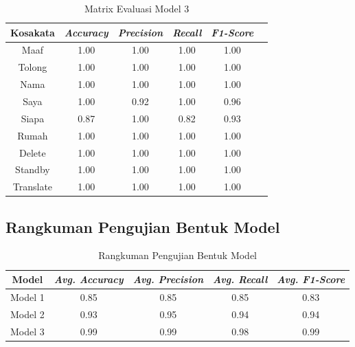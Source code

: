 \begin{longtable}{|c|c|c|c|c|c|}
  \caption{Matrix Evaluasi Model 3}
  \label{tb:model3stat}                                   \\
  \hline
  \rowcolor[HTML]{C0C0C0}
  \textbf{Kosakata} & \textbf{\emph{Accuracy}} & \textbf{\emph{Precision}} & \textbf{\emph{Recall}} & \textbf{\emph{F1-Score}} \\
  \hline
  Maaf              & 1.00                       & 1.00                        & 1.00                   & 1.00                \\
  Tolong            & 1.00                       & 1.00                        & 1.00                   & 1.00                \\
  Nama              & 1.00                       & 1.00                        & 1.00                   & 1.00                \\
  Saya              & 1.00                       & 0.92                        & 1.00                   & 0.96                \\
  Siapa             & 0.87                       & 1.00                        & 0.82                   & 0.93                \\
  Rumah             & 1.00                       & 1.00                        & 1.00                   & 1.00                \\
  Delete            & 1.00                       & 1.00                        & 1.00                   & 1.00                \\
  Standby           & 1.00                       & 1.00                        & 1.00                   & 1.00                \\
  Translate         & 1.00                       & 1.00                        & 1.00                   & 1.00                \\
  \hline
\end{longtable}

\subsection{Rangkuman Pengujian Bentuk Model}
\label{sec:analisismodelseluruh}

\begin{longtable}{|c|c|c|c|c|}
  \caption{Rangkuman Pengujian Bentuk Model}
  \label{tb:evaluasiModel}                                   \\
  \hline
  \rowcolor[HTML]{C0C0C0}
  \textbf{Model} & \emph{\textbf{Avg. Accuracy}} & \emph{\textbf{Avg. Precision}} & \emph{\textbf{Avg. Recall}} & \emph{\textbf{Avg. F1-Score}} \\
  \hline
  Model 1 & 0.85 & 0.85 & 0.85 & 0.83 \\
  Model 2 & 0.93 & 0.95 & 0.94 & 0.94 \\
  Model 3 & 0.99 & 0.99 & 0.98 & 0.99 \\
  \hline
\end{longtable}

